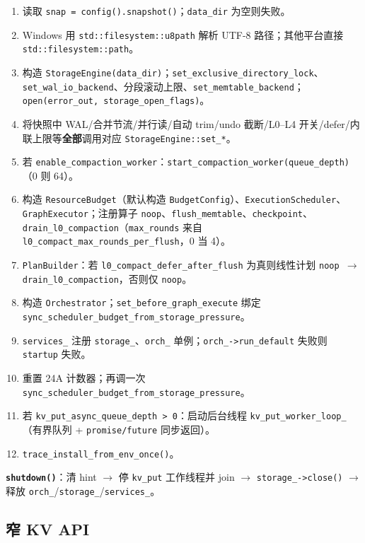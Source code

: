 \begin{enumerate}
  \item 读取 \texttt{snap = config().snapshot()}；\texttt{data\_dir} 为空则失败。
  \item Windows 用 \texttt{std::filesystem::u8path} 解析 UTF-8 路径；其他平台直接 \texttt{std::filesystem::path}。
  \item 构造 \texttt{StorageEngine(data\_dir)}；\texttt{set\_exclusive\_directory\_lock}、\texttt{set\_wal\_io\_backend}、分段滚动上限、\texttt{set\_memtable\_backend}；\texttt{open(error\_out, storage\_open\_flags)}。
  \item 将快照中 WAL/合并节流/并行读/自动 trim/undo 截断/L0--L4 开关/defer/内联上限等\textbf{全部}调用对应 \texttt{StorageEngine::set\_*}。
  \item 若 \texttt{enable\_compaction\_worker}：\texttt{start\_compaction\_worker(queue\_depth)}（0 则 64）。
  \item 构造 \texttt{ResourceBudget}（默认构造 \texttt{BudgetConfig}）、\texttt{ExecutionScheduler}、\texttt{GraphExecutor}；注册算子 \texttt{noop}、\texttt{flush\_memtable}、\texttt{checkpoint}、\texttt{drain\_l0\_compaction}（\texttt{max\_rounds} 来自 \texttt{l0\_compact\_max\_rounds\_per\_flush}，0 当 4）。
  \item \texttt{PlanBuilder}：若 \texttt{l0\_compact\_defer\_after\_flush} 为真则线性计划 \texttt{noop $\rightarrow$ drain\_l0\_compaction}，否则仅 \texttt{noop}。
  \item 构造 \texttt{Orchestrator}；\texttt{set\_before\_graph\_execute} 绑定 \texttt{sync\_scheduler\_budget\_from\_storage\_pressure}。
  \item \texttt{services\_} 注册 \texttt{storage\_}、\texttt{orch\_} 单例；\texttt{orch\_->run\_default} 失败则 \texttt{startup} 失败。
  \item 重置 24A 计数器；再调一次 \texttt{sync\_scheduler\_budget\_from\_storage\_pressure}。
  \item 若 \texttt{kv\_put\_async\_queue\_depth > 0}：启动后台线程 \texttt{kv\_put\_worker\_loop\_}（有界队列 + \texttt{promise/future} 同步返回）。
  \item \texttt{trace\_install\_from\_env\_once()}。
\end{enumerate}

\textbf{\texttt{shutdown()}}：清 hint $\rightarrow$ 停 \texttt{kv\_put} 工作线程并 join $\rightarrow$ \texttt{storage\_->close()} $\rightarrow$ 释放 \texttt{orch\_}/\texttt{storage\_}/\texttt{services\_}。

\subsection{窄 KV API}

